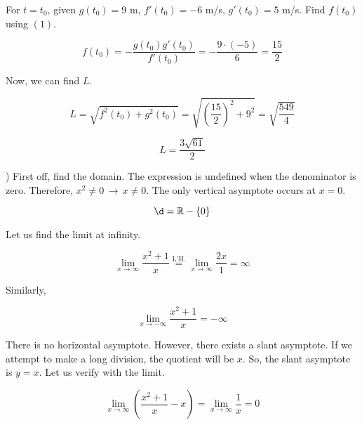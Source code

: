 \documentclass{article}
\begin{document}
\noindent For $t=t_0$, given $g(t_0) = 9$ m, $f'(t_0) = -6$ m/s, $g'(t_0) = 5$ m/s. Find $f(t_0)$ using $(1)$.

\begin{equation*}f(t_0) = -\frac{g(t_0)g'(t_0)}{f'(t_0)} = -\frac{9\cdot (-5)}{6} = \frac{15}{2}\end{equation*}

\noindent Now, we can find $L$.

\begin{equation*}L =\sqrt{f^2(t_0) + g^2(t_0)} = \sqrt{\left(\frac{15}{2}\right)^2 + 9^2} = \sqrt{\frac{549}{4}}\end{equation*}

\hfill

\begin{equation*}\boxed{L=\frac{3\sqrt{61}}{2}}\end{equation*}

\hfill

) First off, find the domain. The expression is undefined when the denominator is zero. Therefore, $x^2 \neq 0 \,\rightarrow\, x\neq0$. The only vertical asymptote occurs at $x = 0$.

\begin{equation*}\d = \mathbb{R} - \{0\} \end{equation*}

\hfill

\noindent Let us find the limit at infinity.

\begin{equation*}\lim_{x\to \infty} \frac{x^2+1}{x} \overset{\text{L'H.}}{=} \lim_{x\to \infty} \frac{2x}{1} = \infty\end{equation*}

\noindent Similarly,

\begin{equation*}\lim_{x\to -\infty} \frac{x^2+ 1}{x} = -\infty\end{equation*}

\hfill

\noindent There is no horizontal asymptote. However, there exists a slant asymptote. If we attempt to make a long division, the quotient will be $x$. So, the slant asymptote is $y=x$. Let us verify with the limit.

\begin{equation*}\lim_{x\to\infty} \left(\frac{x^2+1}{x} - x\right) = \lim_{x\to\infty} \frac{1}{x} = 0\end{equation*}

\hfill
\end{document}
